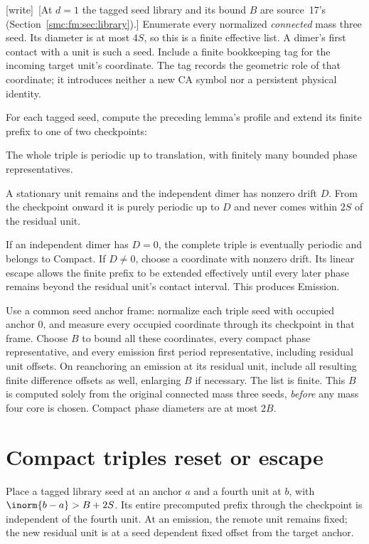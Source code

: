 \documentclass[11pt,letterpaper]{article}
\numberwithin{equation}{section}
\theoremstyle{definition}
\theoremstyle{remark}
\newcommand{\wtag}{\textup{[write]}}
\begin{document}
\wtag\ [At $d=1$ the tagged seed library and its bound $B$ are source~17's (Section~\ref{smc:fm:sec:library}).] Enumerate every normalized \emph{connected} mass three seed. Its diameter is at most $4S$, so this is a finite effective list. A dimer's first contact with a unit is such a seed. Include a finite bookkeeping tag for the incoming target unit's coordinate. The tag records the geometric role of that coordinate; it introduces neither a new CA symbol nor a persistent physical identity.

For each tagged seed, compute the preceding lemma's profile and extend its finite prefix to one of two checkpoints:
\begin{description}[style=nextline,leftmargin=0pt,labelsep=0pt]
\item[Compact] The whole triple is periodic up to translation, with finitely many bounded phase representatives.
\item[Emission] A stationary unit remains and the independent dimer has nonzero drift $D$. From the checkpoint onward it is purely periodic up to $D$ and never comes within $2S$ of the residual unit.
\end{description}
If an independent dimer has $D=0$, the complete triple is eventually periodic and belongs to Compact. If $D\ne0$, choose a coordinate with nonzero drift. Its linear escape allows the finite prefix to be extended effectively until every later phase remains beyond the residual unit's contact interval. This produces Emission.

Use a common seed anchor frame: normalize each triple seed with occupied anchor $0$, and measure every occupied coordinate through its checkpoint in that frame. Choose $B$ to bound all these coordinates, every compact phase representative, and every emission first period representative, including residual unit offsets. On reanchoring an emission at its residual unit, include all resulting finite difference offsets as well, enlarging $B$ if necessary. The list is finite. This $B$ is computed solely from the original connected mass three seeds, \emph{before} any mass four core is chosen. Compact phase diameters are at most $2B$.

\section{Compact triples reset or escape}\label{smc:zd:sec:compact}
Place a tagged library seed at an anchor $a$ and a fourth unit at $b$, with $\inorm{b-a}>B+2S$. Its entire precomputed prefix through the checkpoint is independent of the fourth unit. At an emission, the remote unit remains fixed; the new residual unit is at a seed dependent fixed offset from the target anchor.
\end{document}
